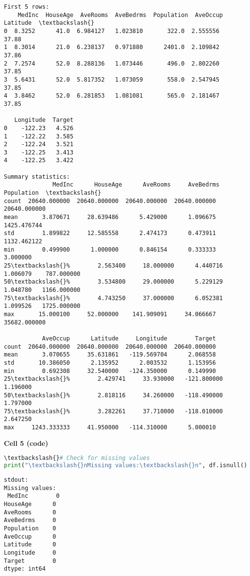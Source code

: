 \documentclass{article}
\begin{document}
{{{{\begin{lstlisting}[backgroundcolor=\color{outputbg}, frame=single]
First 5 rows:
    MedInc  HouseAge  AveRooms  AveBedrms  Population  AveOccup  Latitude  \textbackslash{}
0  8.3252      41.0  6.984127   1.023810       322.0  2.555556     37.88   
1  8.3014      21.0  6.238137   0.971880      2401.0  2.109842     37.86   
2  7.2574      52.0  8.288136   1.073446       496.0  2.802260     37.85   
3  5.6431      52.0  5.817352   1.073059       558.0  2.547945     37.85   
4  3.8462      52.0  6.281853   1.081081       565.0  2.181467     37.85   

   Longitude  Target  
0    -122.23   4.526  
1    -122.22   3.585  
2    -122.24   3.521  
3    -122.25   3.413  
4    -122.25   3.422  

Summary statistics:
              MedInc      HouseAge      AveRooms     AveBedrms    Population  \textbackslash{}
count  20640.000000  20640.000000  20640.000000  20640.000000  20640.000000   
mean       3.870671     28.639486      5.429000      1.096675   1425.476744   
std        1.899822     12.585558      2.474173      0.473911   1132.462122   
min        0.499900      1.000000      0.846154      0.333333      3.000000   
25\textbackslash{}%        2.563400     18.000000      4.440716      1.006079    787.000000   
50\textbackslash{}%        3.534800     29.000000      5.229129      1.048780   1166.000000   
75\textbackslash{}%        4.743250     37.000000      6.052381      1.099526   1725.000000   
max       15.000100     52.000000    141.909091     34.066667  35682.000000   

           AveOccup      Latitude     Longitude        Target  
count  20640.000000  20640.000000  20640.000000  20640.000000  
mean       3.070655     35.631861   -119.569704      2.068558  
std       10.386050      2.135952      2.003532      1.153956  
min        0.692308     32.540000   -124.350000      0.149990  
25\textbackslash{}%        2.429741     33.930000   -121.800000      1.196000  
50\textbackslash{}%        2.818116     34.260000   -118.490000      1.797000  
75\textbackslash{}%        3.282261     37.710000   -118.010000      2.647250  
max     1243.333333     41.950000   -114.310000      5.000010  

\end{lstlisting}
\vspace{0.5cm}
\noindent\colorbox{gray!20}{\parbox{\textwidth}{
\textbf{Cell 5 (code)}}
\vspace{0.3cm}
\begin{lstlisting}[language=Python]
\textbackslash{}# Check for missing values
print("\textbackslash{}nMissing values:\textbackslash{}n", df.isnull().sum())
\end{lstlisting}
\begin{lstlisting}[backgroundcolor=\color{outputbg}, frame=single]
stdout: 
Missing values:
 MedInc        0
HouseAge      0
AveRooms      0
AveBedrms     0
Population    0
AveOccup      0
Latitude      0
Longitude     0
Target        0
dtype: int64


\end{lstlisting}}}}}}
\end{document}
